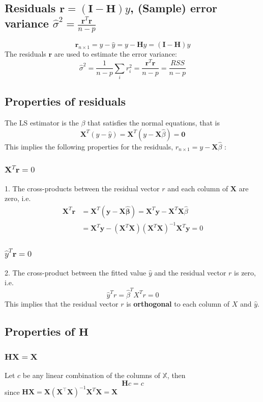 \documentclass[11pt,a4paper]{article}
\begin{document}
\subsection{Residuals $\mathbf{r}=(\mathbf{I}-\mathbf{H}) y$, (Sample) error variance $\hat{\sigma}^2=\frac{\mathbf{r}^T \mathbf{r}}{n-p}$}
$$
\mathbf{r}_{n \times 1}=y-\hat{y}=y-\mathbf{H} y=(\mathbf{I}-\mathbf{H}) y
$$
The residuals $\mathbf{r}$ are used to estimate the error variance:
$$
\hat{\sigma}^2=\frac{1}{n-p} \sum_{i} r_{i}^{2}=\frac{\mathbf{r}^T \mathbf{r}}{n-p}=\frac{R S S}{n-p}
$$

\subsection{Properties of residuals}
The LS estimator is the $\beta$ that satisfies the normal equations, that is
$$
\mathbf{X}^{T}(y-\hat{y})=\mathbf{X}^{T}(y-\mathbf{X} \hat{\beta})=\mathbf{0}
$$
This implies the following properties for the residuals, $r_{n \times 1}=y-\mathbf{X} \hat{\beta}$ :
\subsubsection{$\mathbf{X}^{T} \boldsymbol{r}=0$}
1. The cross-products between the residual vector $r$ and each column of $\mathbf{X}$ are zero, i.e.
$$
\begin{aligned}
\mathbf{X}^{T} \boldsymbol{r} &=\mathbf{X}^{T}(\boldsymbol{y}-\mathbf{X} \hat{\boldsymbol{\beta}})=\mathbf{X}^{T} \boldsymbol{y}-\mathbf{X}^{T} \mathbf{X} \hat{\beta} \\
&=\mathbf{X}^{T} \boldsymbol{y}-\left(\mathbf{X}^{T} \mathbf{X}\right)\left(\mathbf{X}^{T} \mathbf{X}\right)^{-1} \mathbf{X}^{T} \boldsymbol{y}=0
\end{aligned}
$$
\subsubsection{$\hat{y}^{T} \boldsymbol{r}=0$}
2. The cross-product between the fitted value $\hat{y}$ and the residual vector $r$ is zero, i.e.
$$
\hat{y}^{T} r=\hat{\beta}^{T} X^{T} r=0
$$
This implies that the residual vector $r$ is \textbf{orthogonal} to each column of $X$ and $\hat{y}$.\\
\subsection{Properties of $\mathbf{H}$}
\subsubsection{$\mathbf{H X}=\mathbf{X}$}
Let $c$ be any linear combination of the columns of $\mathbb{X}$, then
$$
\mathbf{H} c=c
$$
since $\mathbf{H X}=\mathbf{X}\left(\mathbf{X}^{\top} \mathbf{X}\right)^{-1} \mathbf{X}^{T} \mathbf{X}=\mathbf{X}$
\end{document}
